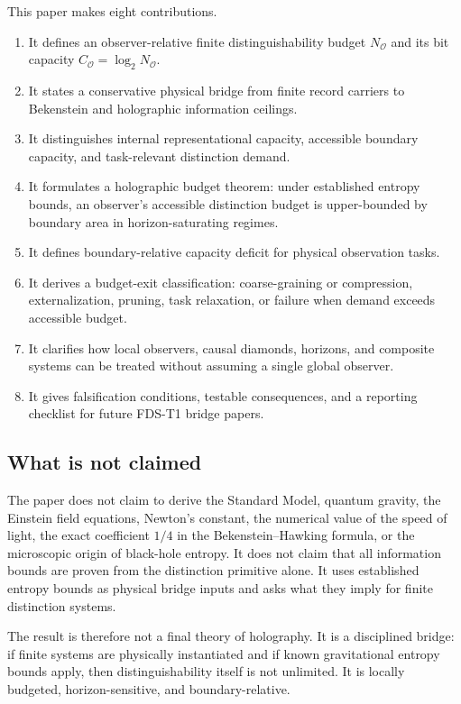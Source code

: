 \documentclass[10pt,a4paper,twocolumn,aps,prl]{revtex4-2}
\newcommand{\Obs}{\mathcal{O}}
\newcommand{\NA}{N_{\Obs}}
\newcommand{\CA}{C_{\Obs}}
\begin{document}
This paper makes eight contributions.

\begin{enumerate}
    \item It defines an observer-relative finite distinguishability budget $\NA$ and its bit capacity $\CA=\log_2\NA$.
    \item It states a conservative physical bridge from finite record carriers to Bekenstein and holographic information ceilings.
    \item It distinguishes internal representational capacity, accessible boundary capacity, and task-relevant distinction demand.
    \item It formulates a holographic budget theorem: under established entropy bounds, an observer's accessible distinction budget is upper-bounded by boundary area in horizon-saturating regimes.
    \item It defines boundary-relative capacity deficit for physical observation tasks.
    \item It derives a budget-exit classification: coarse-graining or compression, externalization, pruning, task relaxation, or failure when demand exceeds accessible budget.
    \item It clarifies how local observers, causal diamonds, horizons, and composite systems can be treated without assuming a single global observer.
    \item It gives falsification conditions, testable consequences, and a reporting checklist for future FDS-T1 bridge papers.
\end{enumerate}

\subsection{What is not claimed}

The paper does not claim to derive the Standard Model, quantum gravity, the Einstein field equations, Newton's constant, the numerical value of the speed of light, the exact coefficient $1/4$ in the Bekenstein--Hawking formula, or the microscopic origin of black-hole entropy. It does not claim that all information bounds are proven from the distinction primitive alone. It uses established entropy bounds as physical bridge inputs and asks what they imply for finite distinction systems.

The result is therefore not a final theory of holography. It is a disciplined bridge: if finite systems are physically instantiated and if known gravitational entropy bounds apply, then distinguishability itself is not unlimited. It is locally budgeted, horizon-sensitive, and boundary-relative.
\end{document}
